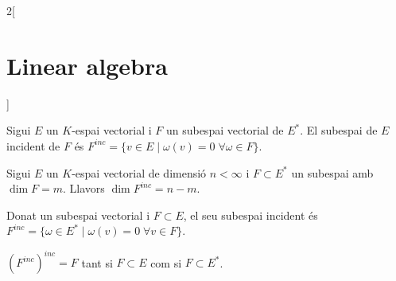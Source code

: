 \documentclass[class=article,10pt,crop=false]{standalone}
\begin{document}
\begin{multicols}{2}[\section{Linear algebra}]
\begin{definition}
\end{definition}
\begin{definition}
Sigui $E$ un $K$-espai vectorial i $F$ un subespai vectorial de $E^*$. El subespai de $E$ incident de $F$ és $F^{inc}=\{v\in E\mid \omega(v)=0\;\forall\omega\in F\}$.
\end{definition}
\begin{theorem}
Sigui $E$ un $K$-espai vectorial de dimensió $n<\infty$ i $F\subset E^*$ un subespai amb $\dim F=m$. Llavors $\dim F^{inc}=n-m$.
\end{theorem}
\begin{definition}
Donat un subespai vectorial i $F\subset E$, el seu subespai incident és $F^{inc}=\{\omega\in E^*\mid \omega(v)=0\;\forall v\in F\}$.
\end{definition}
\begin{prop}
$(F^{inc})^{inc}=F$ tant si $F\subset E$ com si $F\subset E^*$.
\end{prop}

\end{multicols}
\end{document}
